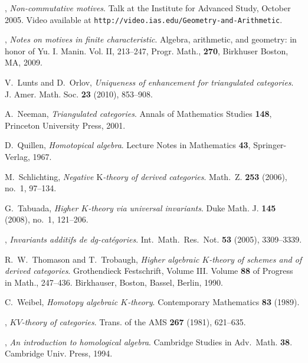 \documentclass{amsart}
\numberwithin{equation}{subsection}
\theoremstyle{remark}
\theoremstyle{remark}
\theoremstyle{remark}
\theoremstyle{remark}
\begin{document}
\begin{thebibliography}{00}
 \bysame, {\em Non-commutative motives}. Talk at the Institute for Advanced Study, October 2005. Video available at {\tt http://video.ias.edu/Geometry-and-Arithmetic}.

 \bysame, {\em Notes on motives in finite characteristic}.  Algebra, arithmetic, and geometry: in honor of Yu. I. Manin. Vol. II,  213--247, Progr. Math., {\bf 270}, Birkhuser Boston, MA, 2009.

 V.~Lunts and D.~Orlov, {\em Uniqueness of enhancement for triangulated categories}. J. Amer. Math. Soc. {\bf 23} (2010), 853--908.

 A.~Neeman, {\em Triangulated categories}. Annals of
  Mathematics Studies {\bf 148}, Princeton University Press, 2001.

 D.~Quillen, {\em Homotopical algebra}. Lecture Notes
  in Mathematics {\bf 43}, Springer-Verlag, 1967.

 M.~Schlichting, {\em Negative $\mbox{K}$-theory of derived categories}. Math.~Z. {\bf 253} (2006), no.~1, 97--134.

 G.~Tabuada, {\em Higher $K$-theory via universal invariants}.
Duke Math. J. {\bf 145} (2008), no.~1, 121--206.

 \bysame, {\em Invariants additifs de dg-cat{\'e}gories}.
Int.~Math.~Res.~Not. {\bf 53} (2005), 3309--3339.

 R.~W.~Thomason and T.~Trobaugh,
{\em Higher algebraic $K$-theory of schemes and of derived 
categories}. Grothendieck Festschrift, Volume III. Volume {\bf 88} of
Progress in Math., 247--436. Birkhauser, Boston, Bassel, Berlin, 1990. 

 C.~Weibel, {\em Homotopy algebraic $K$-theory}. Contemporary Mathematics {\bf 83} (1989).

 \bysame, {\em $KV$-theory of categories}. Trans. of the AMS {\bf 267} (1981), 621--635. 

 \bysame, {\em An introduction to homological algebra}. Cambridge Studies in Adv.~Math. {\bf 38}. Cambridge Univ. Press, 1994. 

\end{thebibliography}
\end{document}
